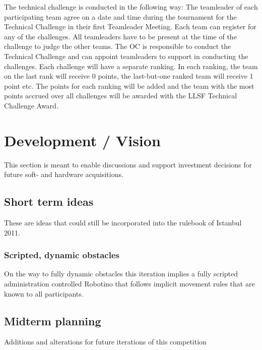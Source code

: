 \documentclass[12pt,twoside]{article}
\newenvironment{rulechange}{}{}
\begin{document}
\begin{rulechange}
  The technical challenge is conducted in the following way: The
  teamleader of each participating team agree on a date and time
  during the tournament for the Technical Challenge in their first
  Teamleader Meeting. Each team can register for any of the
  challenges. All teamleaders have to be present at the time of the
  challenge to judge the other teams. The OC is responsible to conduct
  the Technical Challenge and can appoint teamleaders to support in
  conducting the challenges. Each challenge will have a separate
  ranking. In each ranking, the team on the last rank will receive 0
  points, the last-but-one ranked team will receive 1 point etc. The
  points for each ranking will be added and the team with the most
  points accrued over all challenges will be awarded with the
  LLSF Technical Challenge Award.

\end{rulechange}


\section{Development / Vision}

This section is meant to enable discussions and support investment
decisions for future soft- and hardware acquisitions.

\subsection{Short term ideas}

These are ideas that could still be incorporated into the rulebook of
Istanbul 2011. 

\subsubsection{Scripted, dynamic obstacles}

On the way to fully dynamic obstacles this iteration implies a fully
scripted administration controlled Robotino that follows implicit
movement rules that are known to all participants.

\subsection{Midterm planning}
Additions and alterations for future iterations of this competition
\end{document}
